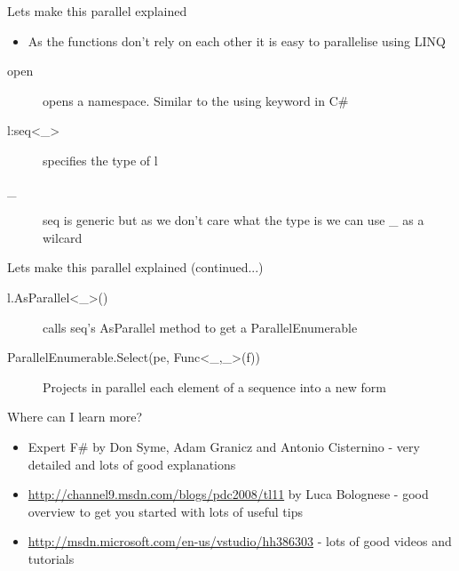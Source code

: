 \documentclass[landscape]{slides}
\begin{document}
\begin{slide}{Lets make this parallel explained}
\begin{itemize}
\item As the functions don't rely on each other it is easy to parallelise using LINQ
\end{itemize}
\begin{description}
\item[open] opens a namespace. Similar to the using keyword in C\#
\item[l:seq\textless\_\textgreater] specifies the type of l
\item[\_] seq is generic but as we don't care what the type is we can use \_ as a wilcard
\end{description}
\end{slide}

\begin{slide}{Lets make this parallel explained (continued...)}
\begin{description}
\item[l.AsParallel\textless\_\textgreater()] calls seq's AsParallel method to get a ParallelEnumerable
\item[ParallelEnumerable.Select(pe, Func\textless\_,\_\textgreater(f))] Projects in parallel each element of a sequence into a new form
\end{description}
\end{slide}

\begin{slide}{Where can I learn more?}
\begin{itemize}
\item Expert F\# by Don Syme, Adam Granicz and Antonio Cisternino - very detailed and lots of good explanations
\item \href{http://channel9.msdn.com/blogs/pdc2008/tl11}{http://channel9.msdn.com/blogs/pdc2008/tl11} by Luca Bolognese - good overview to get you started with lots of useful tips
\item \href{http://msdn.microsoft.com/en-us/vstudio/hh386303}{http://msdn.microsoft.com/en-us/vstudio/hh386303} - lots of good videos and tutorials
\end{itemize}
\end{slide}
\end{document}
